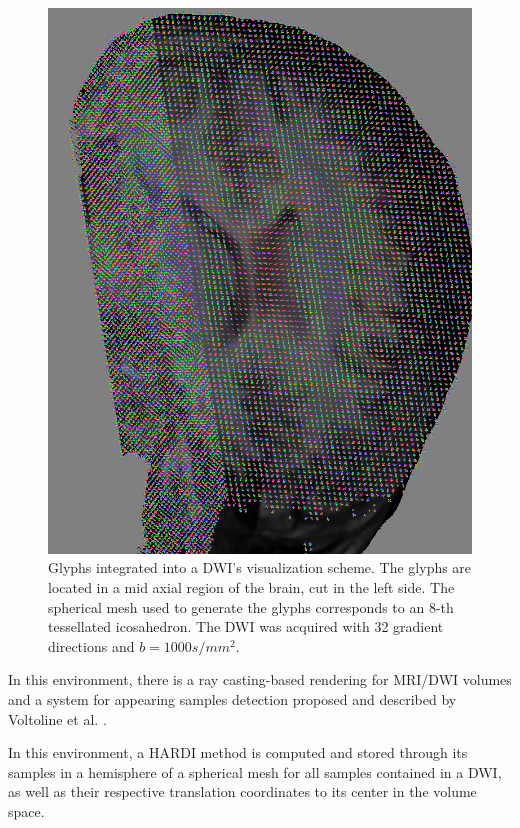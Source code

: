 \documentclass[twoside,twocolumn,10pt]{article}
\begin{document}
\begin{figure}[ht]
    \centering
    \includegraphics[width=1.00\linewidth, angle=0]{figs/Results/glyphs_integrated_DWI.png}
    \caption{Glyphs integrated into a DWI's visualization scheme. The glyphs are located in a mid axial region of the brain, cut in the left side. The spherical mesh used to generate the glyphs corresponds to an 8-th tessellated icosahedron. The DWI was acquired with 32 gradient directions and $b=1000s/mm^2$.
    }
    \label{fig::ex_glyph_DWI_visualization}
\end{figure}

In this environment, there is a ray casting-based rendering for MRI/DWI volumes and a system for appearing samples detection proposed and described by Voltoline et al. \cite{voltoline2021}. 

In this environment, a HARDI method is computed and stored through its samples in a hemisphere of a spherical mesh for all samples contained in a DWI, as well as their respective translation coordinates to its center in the volume space.
\end{document}
